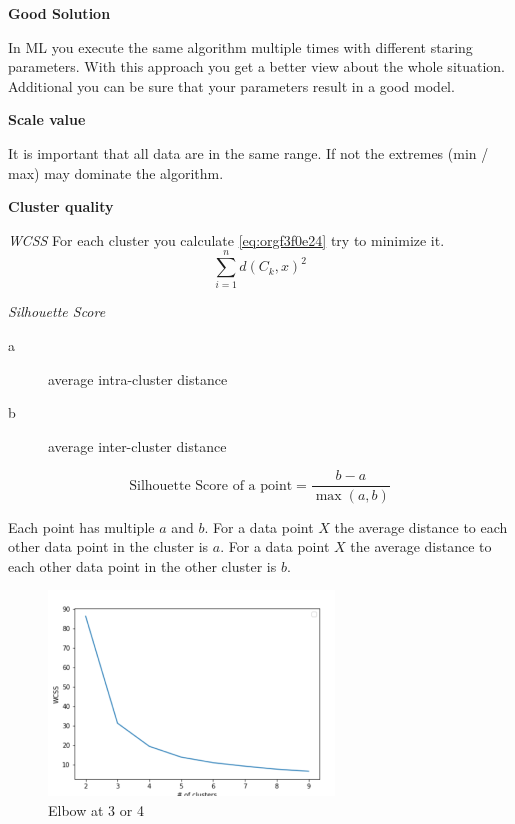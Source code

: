 \documentclass[11pt,twoside,landscape]{article}
\begin{document}
\begin{multicols}{3}
\textbf{Good Solution}

In ML you execute the same algorithm multiple times with different staring parameters.
With this approach you get a better view about the whole situation.
Additional you can be sure that your parameters result in a good model.


\textbf{Scale value}

It is important that all data are in the same range.
If not the extremes (min / max) may dominate the algorithm.


\textbf{Cluster quality}

\emph{WCSS}
For each cluster you calculate \ref{eq:orgf3f0e24} try to minimize it.
\begin{equation}
\label{eq:orgf3f0e24}
\sum_{i=1}^n d(C_k, x)^2
\end{equation}

\emph{Silhouette Score}
\begin{description}
\item[{a}] average intra-cluster distance
\item[{b}] average inter-cluster distance
\end{description}
\begin{equation}
  \text{Silhouette Score of a point} = \frac{b-a}{\max(a,b)}
\end{equation}

Each point has multiple \(a\) and \(b\).
For a data point \(X\) the average distance to each other data point in the cluster is \(a\).
For a data point \(X\) the average distance to each other data point in the other cluster is \(b\).


\begin{figure}[htbp]
\centering
\includegraphics[width=.9\linewidth]{img/elbow_method.png}
\caption{Elbow at 3 or 4}
\end{figure}


\end{multicols}
\end{document}
